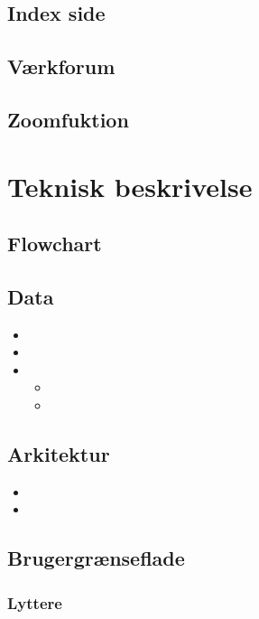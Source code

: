 \documentclass[final]{rapport1}
\begin{document}
\subsection{Index side}

\subsection{Værkforum}



\subsection{Zoomfuktion}


\section{Teknisk beskrivelse}
\subsection{Flowchart}

\subsection{Data}
\begin{itemize}
\item 
\item
\item 
\begin{itemize}
\item 
\item 
\end{itemize}
\end{itemize}

\subsection{Arkitektur}
\begin{itemize}
\item 
\item 
\end{itemize}

\subsection{Brugergrænseflade}
\subsubsection{Lyttere}
\end{document}
